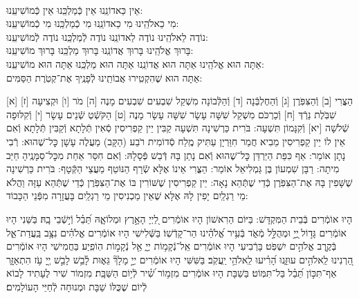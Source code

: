 \documentclass[twoside, openany, parskip=half, 11pt]{book}
\begin{document}
\shabbossimshalom


\tachanunim

\\

\fullkaddish




\label{einkelokeinu}
\hfill אֵין כַּאדוֹנֵֽנוּ \hfill אֵין כְּֿמַלְכֵּֽנוּ \hfill אֵין כְּֿמוֹשִׁיעֵֽנוּ:\\
מִי כֵאלֹהֵֽינוּ \hfill מִי כַאדוֹנֵֽנוּ \hfill מִי כְֿמַלְכֵּֽנוּ \hfill מִי כְֿמוֹשִׁיעֵֽנוּ:\\
נוֹדֶה לֵאלֹהֵֽינוּ \hfill נוֹדֶה לַאדוֹנֵֽנוּ \hfill נוֹדֶה לְֿמַלְכֵּֽנוּ \hfill נוֹדֶה לְֿמוֹשִׁיעֵֽנוּ:\\
בָּרוּךְ אֱלֹהֵֽינוּ \hfill בָּרוּךְ אֲדוֹנֵֽנוּ \hfill בָּרוּךְ מַלְכֵּֽנוּ \hfill בָּרוּךְ מוֹשִׁיעֵֽנוּ:\\
אַתָּה הוּא אֱלֹהֵֽינוּ אַתָּה הוּא אֲדוֹנֵֽנוּ אַתָּה הוּא מַלְכֵּֽנוּ אַתָּה הוּא מוֹשִׁיעֵֽנוּ:\\
אַתָּה הוּא שֶׁהִקְטִֽירוּ אֲבוֹתֵֽינוּ לְֿפָנֶֽיךָ אֶת־קְטֹֽרֶת הַסַּמִּים:

\nextpage

[א] הַצֳּרִי [ב] וְֿהַצִּפֹּֽרֶן [ג] וְֿהַחֶלְבְּֿנָה [ד] וְֿהַלְּֿבוֹנָה מִשְׁקַל שִׁבְעִים שִׁבְעִים מָנֶה [ה] מֹר [ו] וּקְצִיעָה [ז] שִׁבֹּֽלֶת נֵרְֿדְּ [ח] וְֿכַרְכֹּם מִשְׁקַל שִׁשָּׁה עָשָׂר שִׁשָּׁה עָשָׂר מָנֶה [ט] הַקֹּשְֿׁטְ שְֿׁנֵים עָשָׂר [י] וְֿקִלּוּפָה שְֿׁלֹשָׁה [יא] וְֿקִנָּמוֹן תִּשְׁעָה: בֹּרִית כַּרְשִׁינָה תִּשְׁעָה קַבִּין יֵין קַפְרִיסִין סְֿאִין תְּֿלָתָא וְֿקַבִּין תְּֿלָתָא וְֿאִם אֵין לוֹ יֵין קַפְרִיסִין מֵבִיא חֲמַר חִוַּרְיָן עַתִּיק מֶֽלַח סְֿדוֹמִית רֹבַע (הַקָּב) מַעֲלֶה עָשָׁן כׇּל־שֶׁהוּא: רְֿבִי נָתָן אוֹמֵר: אַף כִּפַּת הַיַּרְדֵּן כׇּל־שֶׁהוּא וְֿאִם נָתַן בָּהּ דְּֿבַשׁ פְּֿסָלָהּ: וְֿאִם חִסַּר אַחַת מִכׇּל־סַמָּנֶֽיהָ חַיַּב מִיתָה: רַבָּן שִׁמְעוֹן בֶּן גַּמְלִיאֵל אוֹמֵר: הַצֳּרִי אֵינוֹ אֶלָּא שְֿׂרָף הַנּוֹטֵף מֵעֲצֵי הַקְּֿטָף: בֹּרִית כַּרְשִׁינָה שֶׁשָּׁפִין בָּהּ אֶת־הַצִּפֹּֽרֶן כְּֿדֵי שֶׁתְּֿהֵא נָאָה: יֵין קַפְרִיסִין שֶׁשּׁוֹרִין בּוֹ אֶת־הַצִּפֹּֽרֶן כְּֿדֵי שֶׁתְּֿהֵא עַזָּה וַהֲלֹא מֵי רַגְלַֽיִם יָפִין לָהּ אֶלָּא שֶׁאֵין מַכְנִיסִין מֵי רַגְלַֽיִם בָּעֲזָרָה מִפְּֿנֵי הַכָּבוֹד:

\vspace{-.3\baselineskip}
הָיוּ אוֹמְֿרִים בְּֿבֵית הַמִּקְדָּשׁ:
בַּיּוֹם הַרִאשׁוֹן הָיוּ אוֹמְֿרִים לַ֭יְיָ הָאָ֣רֶץ וּמְלוֹאָ֑הּ תֵּ֝בֵ֗ל וְֿי֣שְֿׁבֵי בָֽהּ׃
בַּשֵּׁנִי הָיוּ אוֹמְֿרִים גָּד֣וֹל ֖יְיָ֣ וּמְהֻלָּ֣ל מְֿאֹ֑ד בְּֿעִ֥יר אֱ֝לֹהֵ֗ינוּ הַר־קָדְֿשֽׁוֹ׃
בַּשְּֿׁלִישִׁי הָיוּ אוֹמְֿרִים אֱלֹהִ֗ים נִצָּ֥ב בַּֽעֲדַת־אֵ֑ל בְּֿקֶ֖רֶב אֱלֹהִ֣ים יִשְׁפֹּֽט׃ בָּרְֿבִיעִי הָיוּ אוֹמְֿרִים אֵֽל־נְֿקָמ֥וֹת יְיָ֑ אֵ֖ל נְֿקָמ֣וֹת הֽוֹפִֽיַע׃ בַּחֲמִישִׁי הָיוּ אוֹמְֿרִים הַ֭רְנִינוּ לֵֽאלֹהִ֣ים עוּזֵּ֑נוּ הָ֝רִ֗יעוּ לֵֽאלֹהֵ֥י יַֽעֲקֹֽב׃ בַּשִּׁשִּׁי הָיוּ אוֹמְֿרִים יְיָ֣ מָלָךְ֘ גֵּא֢וּת לָ֫בֵ֥שׁ לָבֵ֣שׁ יְ֖יָ עֹ֥ז הִתְאַזָּ֑ר אַף־תִּכּ֣וֹן תֵּ֝בֵ֗ל בַּל־תִּמּֽוֹט׃ בַּשַׁבָּת הָיוּ אוֹמְֿרִים מִזְמ֥וֹר שִׁ֝֗יר לְֿי֥וֹם הַשַּׁבָּֽת׃ מִזְמוֹר שִׁיר לֶעָתִיד לָבוֹא לְֿיוֹם שֶׁכֻּלּוֹ שַׁבָּת וּמְנוּחָה לְֿחַיֵּי הָעוֹלָמִים׃
\end{document}
